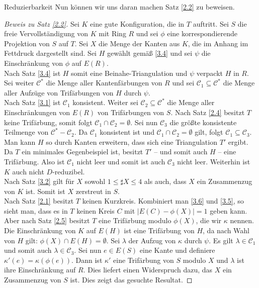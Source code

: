\begin{section}{Reduzierbarkeit}
 Nun können wir uns daran machen Satz \ref{2.2} zu beweisen.
 \begin{proof}[Beweis zu Satz \ref{2.2}]
  Sei $K$ eine gute Konfiguration, die in $T$ auftritt. Sei $S$ die freie Vervollständigung von $K$ mit Ring $R$ und sei $\phi$ eine korrespondierende Projektion von $S$ auf $T$. Sei $X$ die Menge der Kanten aus $K$, die im Anhang im Fettdruck dargestellt sind. Sei $H$ gewählt gemäß \ref{3.4} und sei $\psi$ die Einschränkung von $\phi$ auf $E(R)$.\\
  Nach Satz \ref{3.4} ist $H$ somit eine Beinahe-Triangulation und $\psi$ verpackt $H$ in $R$. Sei weiter $\mathscr{C}^*$ die Menge aller Kantenfärbungen von $R$ und sei $\mathscr{C}_1 \subseteq \mathscr{C}^*$ die Menge aller Aufzüge von Trifärbungen von $H$ durch $\psi$.\\
  Nach Satz \ref{3.1} ist $\mathscr{C}_1$ konsistent. Weiter sei $\mathscr{C}_2 \subseteq \mathscr{C}^*$ die Menge aller Einschränkungen von $E(R)$ von Trifärbungen von $S$. Nach Satz \ref{2.4} besitzt $T$ keine Trifärbung, somit folgt $\mathscr{C}_1 \cap \mathscr{C}_2 = \emptyset$. Sei nun $\mathscr{C}_3$ die größte konsistente Teilmenge von $\mathscr{C}^* - \mathscr{C}_2$. Da $\mathscr{C}_1$ konsistent ist und $\mathscr{C}_1 \cap \mathscr{C}_2 = \emptyset$ gilt, folgt $\mathscr{C}_1 \subseteq \mathscr{C}_3$.\\
  Man kann $H$ so durch Kanten erweitern, dass sich eine Triangulation $T'$ ergibt. Da $T$ ein minimales Gegenbeispiel ist, besitzt $T'$ -- und somit auch $H$ -- eine Trifärbung. Also ist $\mathscr{C}_1$ nicht leer und somit ist auch $\mathscr{C}_3$ nicht leer. Weiterhin ist $K$ auch nicht $D$-reduzibel.\\
  Nach Satz \ref{3.2} gilt für $X$ sowohl $1 \leq \sharp X \leq 4$ als auch, dass $X$ ein Zusammenzug von $K$ ist. Somit ist $X$ zerstreut in $S$. \\
  Nach Satz \ref{2.1} besitzt $T$ keinen Kurzkreis. Kombiniert man \ref{3.6} und \ref{3.5}, so sieht man, dass es in $T$ keinen Kreis $C$ mit $|E(C) - \phi(X)| = 1$ geben kann. Aber nach Satz \ref{2.5} besitzt $T$ eine Trifärbung modulo $\phi(X)$, die wir $\kappa$ nennen. Die Einschränkung von $K$ auf $E(H)$ ist eine Trifärbung von $H$, da nach Wahl von $H$ gilt: $\phi(X) \cap E(H) = \emptyset$. Sei $\lambda$ der Aufzug von $\kappa$ durch $\psi$. Es gilt $\lambda \in \mathscr{C}_1$ und somit auch  $\lambda \in \mathscr{C}_3$. Sei nun $e \in E(S)$ eine Kante und definiere $\kappa'(e) = \kappa(\phi(e))$. Dann ist $\kappa'$ eine Trifärbung von $S$ modulo $X$ und $\lambda$ ist ihre Einschränkung auf $R$. Dies liefert einen Widerspruch dazu, das $X$ ein Zusammenzug von $S$ ist. Dies zeigt das gesuchte Resultat.
 \end{proof}
\end{section}